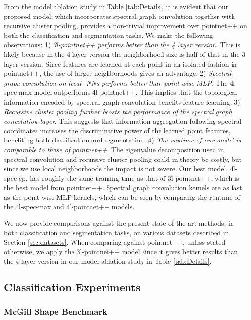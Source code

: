\documentclass[runningheads]{llncs}
\begin{document}
From the model ablation study in Table \ref{tab:Details}, it is evident that our proposed model, which incorporates spectral graph convolution together with recursive cluster pooling, provides a non-trivial improvement over pointnet++ on both the classification and segmentation tasks. We make the following observations:
1) {\em 3l-pointnet++ performs better than the 4 layer version.} This is likely because in the 4 layer version the neighborhood size is half of that in the 3 layer version. Since features are learned at each point in an isolated fashion in pointnet++, the use of larger neighborhoods gives an advantage.
2) {\em Spectral graph convolution on local -NNs performs better than point-wise MLP.} The 4l-spec-max model outperforms 4l-pointnet++. This implies that the topological information encoded by spectral graph convolution benefits feature learning.
3) {\em Recursive cluster pooling further boosts the performance of the spectral graph convolution layer.} This suggests that information aggregation following spectral coordinates increases the discriminative power of the learned point features, benefiting both classification and segmentation.
4) {\em The runtime of our model is comparable to those of pointnet++.} The eigenvalue decomposition used in spectral convolution and recursive cluster pooling could in theory be costly, but since we use local neighborhoods the impact is not severe. Our best model, 4l-spec-cp, has roughly the same training time as that of 3l-pointnet++, which is the best model from pointnet++. Spectral graph convolution kernels are as fast as the point-wise MLP kernels, which can be seen by comparing the runtime of the 4l-spec-max and 4l-pointnet++ models.


We now provide comparisons against the present state-of-the-art methods, in both classification and segmentation tasks, on
various datasets described in Section \ref{sec:datasets}. When comparing against pointnet++, unless stated otherwise, we apply the 3l-pointnet++ model since it gives better results than the 4 layer version in our model ablation study in Table \ref{tab:Details}.


\subsection{Classification Experiments}

\subsubsection{McGill Shape Benchmark}\label{sec:exp_mcgill}
\end{document}
